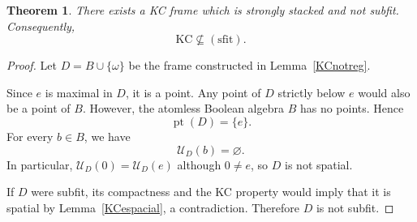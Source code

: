 \documentclass[11pt]{amsart}
\DeclareMathOperator{\pt}{pt}
\theoremstyle{plain}
\newtheorem{thm}{Theorem}[section]
\theoremstyle{definition}
\begin{document}
\begin{thm}\label{KCnosfit}
There exists a KC frame which is strongly
stacked and not subfit. Consequently,
\[
\mathrm{KC}\not\subseteq\mathrm{(sfit)}.
\]
\end{thm}

\begin{proof}
Let $D=B\cup\{\omega\}$ be the frame constructed
in Lemma~\ref{KCnotreg}.

Since $e$ is maximal in $D$, it is a point.
Any point of $D$ strictly below $e$ would also be a point
of $B$. However, the atomless Boolean algebra $B$ has no
points. Hence
\[
    \pt(D)=\{e\}.
\]
For every $b\in B$, we have
\[
    \mathcal U_D(b)=\varnothing.
\]
In particular, $\mathcal U_D(0)=\mathcal U_D(e)$ although
$0\neq e$, so $D$ is not spatial.

If $D$ were subfit, its compactness and the KC property
would imply that it is spatial by
Lemma~\ref{KCespacial},
a contradiction. Therefore $D$ is not subfit.
\end{proof}
\end{document}

